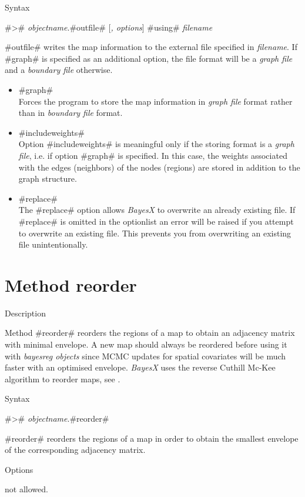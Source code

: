 \begin{stanza}{Syntax}

#># {\em objectname}.#outfile# [{\em , options}] #using# {\em
filename}

#outfile# writes the map information to the external file
specified in {\em filename}. If #graph# is specified as an
additional option, the file format will be a {\em graph file} and
a {\em boundary file} otherwise.
\end{stanza}


\begin{itemize}
\item #graph# \\
Forces the program to store the map information in {\em graph
file} format rather than in {\em boundary file} format.
\item #includeweights# \\
Option #includeweights# is meaningful only if the storing format
is a {\em graph file}, i.e. if option #graph# is specified. In
this case, the weights associated with the edges (neighbors) of
the nodes (regions) are stored in addition to the graph structure.
\item #replace# \\
The #replace# option allows {\em BayesX} to overwrite an already
existing file. If #replace# is omitted in the optionlist an error
will be raised if you attempt to overwrite an existing file. This
prevents you from overwriting an existing file unintentionally.
\end{itemize}



\clearpage



\section{Method reorder}
\label{mapreorder}  

\begin{stanza}{Description}

Method #reorder# reorders the regions of a map to obtain an adjacency matrix with minimal envelope. A new map should always be
reordered before using it with {\em bayesreg objects} since MCMC updates for spatial covariates will be much faster with an
optimised envelope. {\em BayesX} uses the reverse Cuthill Mc-Kee algorithm to reorder maps, see .
\end{stanza}

\begin{stanza}{Syntax}

{#># {\em objectname}.#reorder#

#reorder# reorders the regions of a map in order to obtain the
smallest envelope of the corresponding adjacency matrix.}
\end{stanza}

\begin{stanza}{Options}

not allowed.
\end{stanza}

